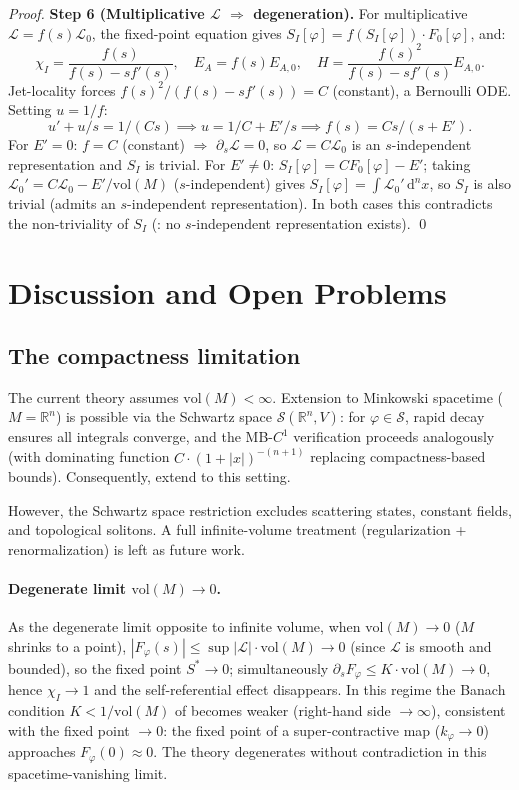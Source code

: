 \documentclass[12pt,letterpaper]{article}
\theoremstyle{definition}
\newcommand{\mL}{\mathcal{L}}
\newcommand{\mS}{\mathcal{S}}
\newcommand{\vol}{\mathrm{vol}}
\newcommand{\R}{\mathbb{R}}
\newcommand{\diff}{\mathrm{d}}
\newcommand{\chiI}{\chi_I}
\newcommand{\EA}{E_A}
\newcommand{\dVol}{\,\diff^n x}
\begin{document}
\begin{proof}
\textbf{Step 6 (Multiplicative $\mL$ $\Rightarrow$ degeneration).} For multiplicative $\mL = f(s) \mL_0$, the fixed-point equation gives $S_I[\varphi] = f(S_I[\varphi]) \cdot F_0[\varphi]$, and:
\[ \chiI = \frac{f(s)}{f(s) - s f'(s)}, \quad \EA = f(s) E_{A,0}, \quad H = \frac{f(s)^2}{f(s) - s f'(s)} E_{A,0}. \]
Jet-locality forces $f(s)^2/(f(s) - s f'(s)) = C$ (constant), a Bernoulli ODE. Setting $u = 1/f$:
\[ u' + u/s = 1/(Cs) \implies u = 1/C + E'/s \implies f(s) = Cs/(s + E'). \]
For $E' = 0$: $f = C$ (constant) $\Rightarrow$ $\partial_s \mL = 0$, so $\mL = C\mL_0$ is an $s$-independent representation and $S_I$ is trivial. For $E' \neq 0$: $S_I[\varphi] = C F_0[\varphi] - E'$; taking $\mL_0' = C\mL_0 - E'/\vol(M)$ ($s$-independent) gives $S_I[\varphi] = \int \mL_0' \dVol$, so $S_I$ is also trivial (admits an $s$-independent representation). In both cases this contradicts the non-triviality of $S_I$ (: no $s$-independent representation exists). \qed
\end{proof}

\section{Discussion and Open Problems}
\label{sec:discussion}

\subsection{The compactness limitation}

The current theory assumes $\vol(M) < \infty$. Extension to Minkowski spacetime ($M = \R^n$) is possible via the Schwartz space $\mS(\R^n, V)$: for $\varphi \in \mS$, rapid decay ensures all integrals converge, and the MB-$C^1$ verification proceeds analogously (with dominating function $C \cdot (1+|x|)^{-(n+1)}$ replacing compactness-based bounds). Consequently,  extend to this setting.

However, the Schwartz space restriction excludes scattering states, constant fields, and topological solitons. A full infinite-volume treatment (regularization + renormalization) is left as future work.

\paragraph{Degenerate limit $\vol(M) \to 0$.}
As the degenerate limit opposite to infinite volume, when $\vol(M) \to 0$ ($M$ shrinks to a point), $|F_\varphi(s)| \leq \sup|\mL| \cdot \vol(M) \to 0$ (since $\mL$ is smooth and bounded), so the fixed point $S^* \to 0$; simultaneously $\partial_s F_\varphi \leq K \cdot \vol(M) \to 0$, hence $\chi_I \to 1$ and the self-referential effect disappears. In this regime the Banach condition $K < 1/\vol(M)$ of  becomes weaker (right-hand side $\to \infty$), consistent with the fixed point $\to 0$: the fixed point of a super-contractive map ($k_\varphi \to 0$) approaches $F_\varphi(0) \approx 0$. The theory degenerates without contradiction in this spacetime-vanishing limit.
\end{document}
